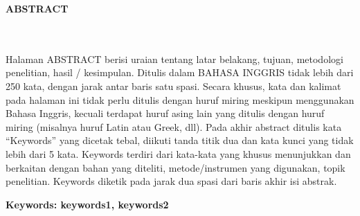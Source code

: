 \clearpage
{}%
\thispagestyle{fancy}

\begin{center}
	\large \bfseries \MakeUppercase{Abstract}\\
	\normalsize \normalfont {\thetitleEN}\\
	\normalsize \normalfont {\theauthor}\\
	\bigskip
	
	\normalsize \normalfont \justifying \singlespacing
	Halaman ABSTRACT berisi uraian tentang latar belakang, tujuan, metodologi penelitian, hasil / kesimpulan. Ditulis dalam BAHASA INGGRIS tidak lebih dari 250 kata, dengan jarak antar baris satu spasi. Secara khusus, kata dan kalimat pada halaman ini tidak perlu ditulis dengan huruf miring meskipun menggunakan Bahasa Inggris, kecuali terdapat huruf asing lain yang ditulis dengan huruf miring (misalnya huruf Latin atau Greek, dll). Pada akhir abstract ditulis kata “Keywords” yang dicetak tebal, diikuti tanda titik dua dan kata kunci yang tidak lebih dari 5 kata. Keywords terdiri dari kata-kata yang khusus menunjukkan dan berkaitan dengan bahan yang diteliti, metode/instrumen yang digunakan, topik penelitian. Keywords diketik pada jarak dua spasi dari baris akhir isi abstrak.\par
    
    \vspace{20pt}
	\raggedright\textbf{Keywords: keywords1, keywords2}
	
	\vfill
	
\end{center}
\clearpage